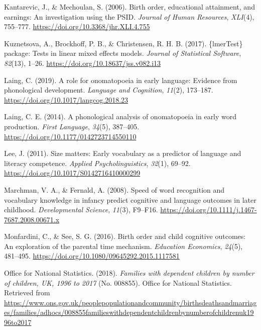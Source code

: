 \documentclass[
  english,
  man,floatsintext]{apa6}
\begin{document}
\leavevmode\hypertarget{ref-kantarevic_birth_2006}{}%
Kantarevic, J., \& Mechoulan, S. (2006). Birth order, educational attainment, and earnings: An investigation using the PSID. \emph{Journal of Human Resources}, \emph{XLI}(4), 755--777. \url{https://doi.org/10.3368/jhr.XLI.4.755}

\leavevmode\hypertarget{ref-kuznetsova_lmertest_2017}{}%
Kuznetsova, A., Brockhoff, P. B., \& Christensen, R. H. B. (2017). \{lmerTest\} package: Tests in linear mixed effects models. \emph{Journal of Statistical Software}, \emph{82}(13), 1--26. \url{https://doi.org/10.18637/jss.v082.i13}

\leavevmode\hypertarget{ref-laing_role_2019}{}%
Laing, C. (2019). A role for onomatopoeia in early language: Evidence from phonological development. \emph{Language and Cognition}, \emph{11}(2), 173--187. \url{https://doi.org/10.1017/langcog.2018.23}

\leavevmode\hypertarget{ref-laing_phonological_2014}{}%
Laing, C. E. (2014). A phonological analysis of onomatopoeia in early word production. \emph{First Language}, \emph{34}(5), 387--405. \url{https://doi.org/10.1177/0142723714550110}

\leavevmode\hypertarget{ref-lee_size_2011}{}%
Lee, J. (2011). Size matters: Early vocabulary as a predictor of language and literacy competence. \emph{Applied Psycholinguistics}, \emph{32}(1), 69--92. \url{https://doi.org/10.1017/S0142716410000299}

\leavevmode\hypertarget{ref-marchman_speed_2008}{}%
Marchman, V. A., \& Fernald, A. (2008). Speed of word recognition and vocabulary knowledge in infancy predict cognitive and language outcomes in later childhood. \emph{Developmental Science}, \emph{11}(3), F9--F16. \url{https://doi.org/10.1111/j.1467-7687.2008.00671.x}

\leavevmode\hypertarget{ref-monfardini_birth_2016}{}%
Monfardini, C., \& See, S. G. (2016). Birth order and child cognitive outcomes: An exploration of the parental time mechanism. \emph{Education Economics}, \emph{24}(5), 481--495. \url{https://doi.org/10.1080/09645292.2015.1117581}

\leavevmode\hypertarget{ref-office_for_national_statistics_families_2018}{}%
Office for National Statistics. (2018). \emph{Families with dependent children by number of children, UK, 1996 to 2017} (No. 008855). Office for National Statistics. Retrieved from \url{https://www.ons.gov.uk/peoplepopulationandcommunity/birthsdeathsandmarriages/families/adhocs/008855familieswithdependentchildrenbynumberofchildrenuk1996to2017}
\end{document}
